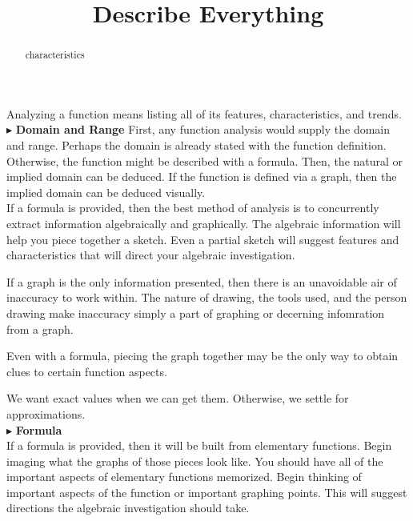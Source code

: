 \documentclass{ximera}
\title{Describe Everything}
\begin{document}
\begin{abstract}
characteristics
\end{abstract}
\maketitle




Analyzing a function means listing all of its features, characteristics, and trends. \\







$\blacktriangleright$ \textbf{\textcolor{red!10!blue!90!}{Domain and Range}}   
First, any function analysis would supply the domain and range.  Perhaps the domain is already stated with the function definition. Otherwise, the function might be described with a formula. Then, the natural or implied domain can be deduced.  If the function is defined via a graph, then the implied domain can be deduced visually. \\

If a formula is provided, then the best method of analysis is to concurrently extract information algebraically and graphically.  The algebraic information will help you piece together a sketch.  Even a partial sketch will suggest features and characteristics that will direct your algebraic investigation.

If a graph is the only information presented, then there is an unavoidable air of inaccuracy to work within.  The nature of drawing, the tools used, and the person drawing make inaccuracy simply a part of graphing or decerning infomration from a graph.

Even with a formula, piecing the graph together may be the only way to obtain clues to certain function aspects. 

We want exact values when we can get them.  Otherwise, we settle for approximations.\\





$\blacktriangleright$ \textbf{\textcolor{red!10!blue!90!}{Formula}}  \\
If a formula is provided, then it will be built from elementary functions.  Begin imaging what the graphs of those pieces look like. You should have all of the important aspects of elementary functions memorized. Begin thinking of important aspects of the function or important graphing points. This will suggest directions the algebraic investigation should take. \\
\end{document}
